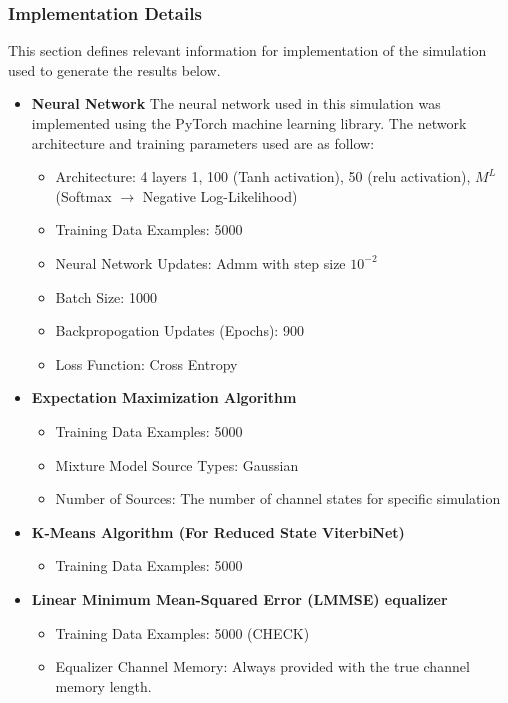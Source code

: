 \documentclass[12pt,a4paper]{report}
\begin{document}
\subsubsection{Implementation Details}
This section defines relevant information for implementation of the simulation used to generate the results below.
\begin{itemize}
\item \textbf{Neural Network}
The neural network used in this simulation was implemented using the PyTorch machine learning library. The network architecture and training parameters used are as follow:
\begin{itemize}
\item Architecture: 4 layers {1, 100 (Tanh activation), 50 (relu activation), $M^L$ (Softmax $\rightarrow$ Negative Log-Likelihood)}
\item Training Data Examples: 5000
\item Neural Network Updates: Admm \cite{kingma2014adam} with step size $10^{-2}$ 
\item Batch Size: 1000 
\item Backpropogation Updates (Epochs): 900
\item Loss Function: Cross Entropy
\end{itemize}
\item \textbf{Expectation Maximization Algorithm}
\begin{itemize}
\item Training Data Examples: 5000
\item Mixture Model Source Types: Gaussian
\item Number of Sources: The number of channel states for specific simulation
\end{itemize}
\item \textbf{K-Means Algorithm (For Reduced State ViterbiNet)}
\begin{itemize}
\item Training Data Examples: 5000
\end{itemize}
\item \textbf{Linear Minimum Mean-Squared Error (LMMSE) equalizer}
\begin{itemize}
\item Training Data Examples: 5000 (CHECK)
\item Equalizer Channel Memory: Always provided with the true channel memory length. 
\end{itemize}

\end{itemize}
\end{document}
